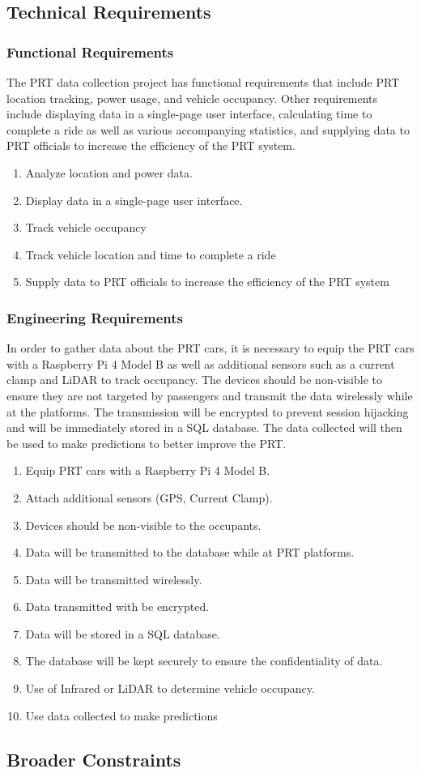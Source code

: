 \subsection{Technical Requirements}
\subsubsection{Functional Requirements}
The PRT data collection project has functional requirements that include PRT location tracking, power usage, and vehicle occupancy. 
Other requirements include displaying data in a single-page user interface, calculating time to complete a ride as well as various accompanying statistics, and supplying data to PRT officials to increase the efficiency of the PRT system.
\begin{enumerate}
    \item Analyze location and power data.
    \item Display data in a single-page user interface.
    \item Track vehicle occupancy
    \item Track vehicle location and time to complete a ride
    \item Supply data to PRT officials to increase the efficiency of the PRT system
\end{enumerate}
\subsubsection{Engineering Requirements}
In order to gather data about the PRT cars, it is necessary to equip the PRT cars with a Raspberry Pi 4 Model B as well as additional sensors such as a current clamp and LiDAR to track occupancy. 
The devices should be non-visible to ensure they are not targeted by passengers and transmit the data wirelessly while at the platforms. 
The transmission will be encrypted to prevent session hijacking and will be immediately stored in a SQL database. 
The data collected will then be used to make predictions to better improve the PRT.
\begin{enumerate}
    \item Equip PRT cars with a Raspberry Pi 4 Model B.
    \item Attach additional sensors (GPS, Current Clamp).
    \item Devices should be non-visible to the occupants.
    \item Data will be transmitted to the database while at PRT platforms.
    \item Data will be transmitted wirelessly.
    \item Data transmitted with be encrypted.
    \item Data will be stored in a SQL database.
    \item The database will be kept securely to ensure the confidentiality of data.
    \item Use of Infrared or LiDAR to determine vehicle occupancy.
    \item Use data collected to make predictions
\end{enumerate}

\subsection{Broader Constraints}
